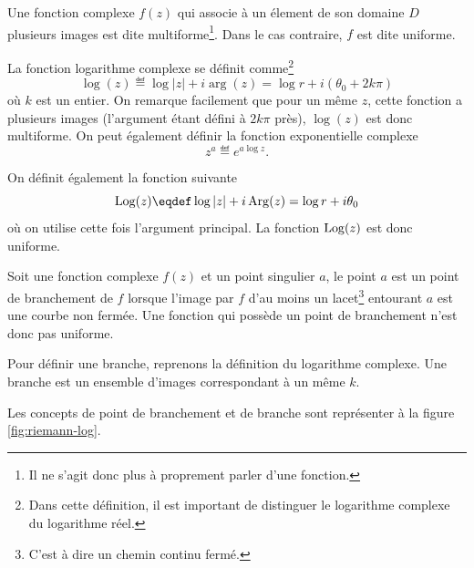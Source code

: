 \begin{mydef}
	Une fonction complexe $f(z)$ qui associe à un élement de son
	domaine $D$ plusieurs images est dite multiforme\footnote{Il
	ne s'agit donc plus à proprement parler d'une fonction.}. Dans
	le cas contraire, $f$ est dite uniforme.
\end{mydef}

\begin{myexem}
	La fonction logarithme complexe se définit comme\footnote{Dans cette
	définition, il est important de distinguer le logarithme complexe
	du logarithme réel.}
	$$\log(z) \eqdef \log|z| + i\arg(z) = \log r + i(\theta_0 + 2k\pi)$$
	où $k$ est un entier. On remarque facilement que pour un même $z$,
	cette fonction a plusieurs images (l'argument étant défini à $2k\pi$
	près), $\log(z)$ est donc multiforme.
	On peut également définir la fonction exponentielle complexe
	$$z^a \eqdef e^{a\log z}.$$
\end{myexem}

\begin{myrem}
	On définit également la fonction suivante
	$$\Log(z) \eqdef \log|z| + i\Arg(z) = \log r + i\theta_0$$
	où on utilise cette fois l'argument principal. La fonction
	$\operatorname{Log}(z)$ est donc uniforme.
\end{myrem}

\begin{mydef}
	Soit une fonction complexe $f(z)$ et un point singulier
	$a$, le point $a$ est un point de branchement de $f$ lorsque
	l'image par $f$ d'au moins un lacet\footnote{C'est à dire un chemin
	continu fermé.} entourant $a$ est une courbe non fermée.
	Une fonction qui possède un point de branchement n'est donc
	pas uniforme.
\end{mydef}

\begin{mydef}[Branche]
	Pour définir une branche, reprenons la définition du
	logarithme complexe. Une branche est un ensemble
	d'images correspondant à un même $k$.
\end{mydef}

Les concepts de point de branchement et de branche sont
représenter à la figure \ref{fig:riemann-log}.

